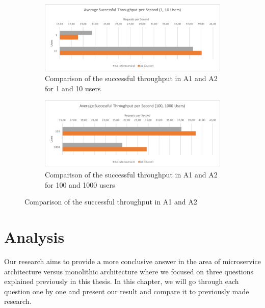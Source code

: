 \documentclass[a4paper,oneside]{bth}
\begin{document}
\begin{figure}[h]
\begin{center}

\begin{subfigure}[b]{1\textwidth}
\includegraphics[width=13cm]{Graph/rq3-stps-1}
\caption{Comparison of the successful throughput in A1 and A2 for 1 and 10 users}
\end{subfigure}

\begin{subfigure}[b]{1\textwidth}
\includegraphics[width=13cm]{Graph/rq3-stps-2}
\caption{Comparison of the successful throughput in A1 and A2 for 100 and 1000 users}
\end{subfigure}


\caption{Comparison of the successful throughput in A1 and A2}
\label{rq3-stps}

\end{center}
\end{figure}



\clearpage
\par\vspace {0.5cm}

\chapter{Analysis} \label{Analysis}
Our research aims to provide a more conclusive answer in the area of microservice architecture versus monolithic architecture where we focused on three questions explained previously in this thesis. In this chapter, we will go through each question one by one and present our result and compare it to previously made research.
\end{document}
